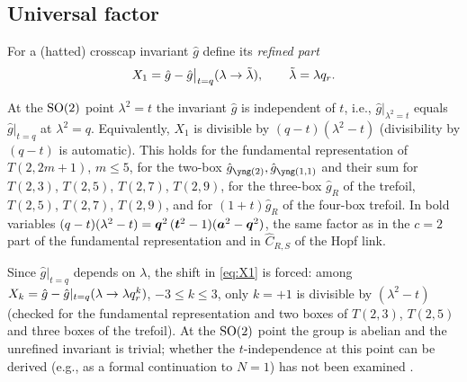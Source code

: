 \subsection{Universal factor}\label{sec:universal}
For a (hatted) crosscap invariant $\hat g$ define its \emph{refined part}
\begin{equation}\label{eq:X1}
X_1 = \hat g - \hat g\big|_{t=q}(\lambda \to \tilde\lambda),\qquad \tilde\lambda = \lambda q_r .
\end{equation}
\begin{result}\label{cr:universal}
At the $\mathrm{SO}(2)$ point $\lambda^2 = t$ the invariant $\hat g$ is independent of $t$, i.e., $\hat g|_{\lambda^2 = t}$ equals $\hat g|_{t=q}$ at $\lambda^2 = q$. Equivalently, $X_1$ is divisible by $(q - t)(\lambda^2 - t)$ (divisibility by $(q - t)$ is automatic). This holds for the fundamental representation of $T(2,2m+1)$, $m \le 5$, for the two-box $\hat g_{\ytwo}, \hat g_{\yoneone}$ and their sum for $T(2,3)$, $T(2,5)$, $T(2,7)$, $T(2,9)$, for the three-box $\hat g_R$ of the trefoil, $T(2,5)$, $T(2,7)$, $T(2,9)$, and for $(1+t)\hat g_R$ of the four-box trefoil. In bold variables $(q - t)(\lambda^2 - t) = \bm{q}^2\,(\bm{t}^2 - 1)(\bm{a}^2 - \bm{q}^2)$, the same factor as in the $c = 2$ part of the fundamental representation and in $\hat C_{R,S}$ of the Hopf link.
\end{result}
Since $\hat g|_{t=q}$ depends on $\lambda$, the shift in \eqref{eq:X1} is forced: among $X_k = \hat g - \hat g|_{t=q}(\lambda \to \lambda q_r^k)$, $-3 \le k \le 3$, only $k = +1$ is divisible by $(\lambda^2 - t)$ (checked for the fundamental representation and two boxes of $T(2,3)$, $T(2,5)$ and three boxes of the trefoil). At the $\mathrm{SO}(2)$ point the group is abelian and the unrefined invariant is trivial; whether the $t$-independence at this point can be derived (e.g., as a formal continuation to $N = 1$) has not been examined \open.

